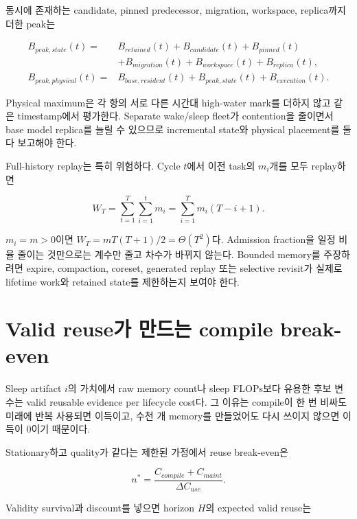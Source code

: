 동시에 존재하는 candidate, pinned predecessor, migration, workspace, replica까지 더한 peak는

\begin{align}
B_{peak,state}(t)={}&B_{retained}(t)+B_{candidate}(t)+B_{pinned}(t)\nonumber\\
&+B_{migration}(t)+B_{workspace}(t)+B_{replica}(t),\\
B_{peak,physical}(t)={}&B_{base,resident}(t)+B_{peak,state}(t)+B_{execution}(t).
\end{align}

Physical maximum은 각 항의 서로 다른 시간대 high-water mark를 더하지 않고 같은 timestamp에서
평가한다. Separate wake/sleep fleet가 contention을 줄이면서 base model replica를 늘릴 수 있으므로
incremental state와 physical placement를 둘 다 보고해야 한다.

Full-history replay는 특히 위험하다. Cycle $t$에서 이전 task의 $m_i$개를 모두 replay하면

\begin{equation}
W_T=\sum_{t=1}^{T}\sum_{i=1}^{t}m_i
=\sum_{i=1}^{T}m_i(T-i+1).
\end{equation}

$m_i=m>0$이면 $W_T=mT(T+1)/2=\Theta(T^2)$다. Admission fraction을 일정 비율 줄이는 것만으로는
계수만 줄고 차수가 바뀌지 않는다. Bounded memory를 주장하려면 expire, compaction, coreset,
generated replay 또는 selective revisit가 실제로 lifetime work와 retained state를 제한하는지 보여야 한다.

\section{Valid reuse가 만드는 compile break-even}

Sleep artifact $i$의 가치에서 raw memory count나 sleep FLOPs보다 유용한 후보 변수는 valid reusable
evidence per lifecycle cost다.\autocite{srcstc0035,srcstc0043,srcstc0051}
그 이유는 compile이 한 번 비싸도 미래에 반복 사용되면 이득이고, 수천 개 memory를 만들었어도 다시
쓰이지 않으면 이득이 0이기 때문이다.

Stationary하고 quality가 같다는 제한된 가정에서 reuse break-even은

\begin{equation}
n^*=\frac{C_{compile}+C_{maint}}{\Delta C_{use}}.
\label{eq:reuse-break-even}
\end{equation}

Validity survival과 discount를 넣으면 horizon $H$의 expected valid reuse는

